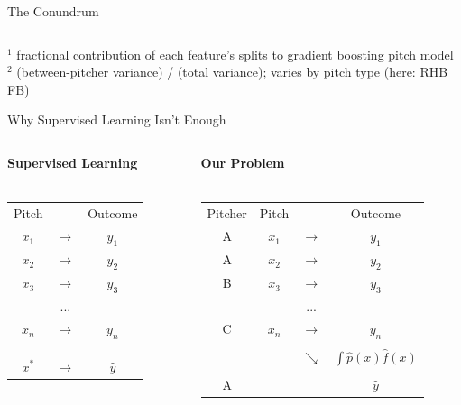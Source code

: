 \documentclass{beamer}
\begin{document}
\begin{frame}{The Conundrum}
\begin{columns}
\begin{column}{0.5\textwidth}
      \end{column}
    \end{columns}
    \scriptsize \color{ricegray}
    \vfill
    ${}^1$ fractional contribution of each feature's splits to gradient boosting pitch model\\
    ${}^2$ (between-pitcher variance) / (total variance); varies by pitch type (here: RHB FB)
  \end{frame}

  \begin{frame}{Why Supervised Learning Isn't Enough}
    \begin{columns}
      \begin{column}{0.4\columnwidth}
        \centering
        {\bf Supervised Learning}\\
        ~\\
        \begin{tabular}{ccc}
          Pitch &               & Outcome\\
          $x_1$ & $\rightarrow$ & $y_1$\\
          $x_2$ & $\rightarrow$ & $y_2$\\
          $x_3$ & $\rightarrow$ & $y_3$\\
                & ...           &      \\
          $x_n$ & $\rightarrow$ & $y_n$\\
          \\
          \\
          \\
          $x^*$ & $\rightarrow$ & $\hat y$\\
        \end{tabular}
      \end{column}
      \begin{column}{0.6\columnwidth}
        \centering
        {\bf Our Problem}\\
        ~\\
        \begin{tabular}{cccc}
          Pitcher & Pitch &               & Outcome\\
          A       & $x_1$ & $\rightarrow$ & $y_1$\\
          A       & $x_2$ & $\rightarrow$ & $y_2$\\
          B       & $x_3$ & $\rightarrow$ & $y_3$\\
                  &       & ...           &      \\
          C       & $x_n$ & $\rightarrow$ & $y_n$\\
                  & \\
                  &       & $\searrow$    & {\color{white} $\int\hat p(x)\hat f(x)$}\\
                  & \\
          A       &       &               & $\hat y$\\
        \end{tabular}
      \end{column}
    \end{columns}
  \end{frame}
\end{document}
